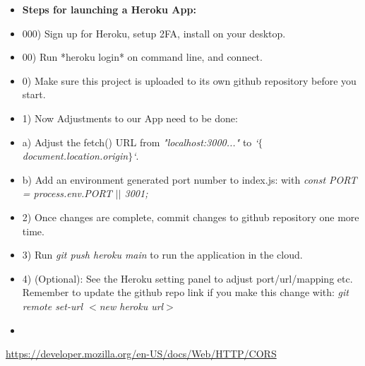 \documentclass[8pt,a4paper]{extarticle}
\begin{document}
\begin{itemize}
\item \textbf{Steps for launching a Heroku App:}

\item 000) Sign up for Heroku, setup 2FA, install on your desktop.

\item 00) Run *heroku login* on command line, and connect.

\item 0) Make sure this project is uploaded to its own github repository before you start.

\item 1) Now Adjustments to our App need to be done:

\item a) Adjust the fetch() URL from \textit{"localhost:3000..."} to \textit{`$\{$document.location.origin$\}$`}.

\item   b) Add an environment generated port number to index.js: with \textit{const PORT = process.env.PORT $\vert \vert$ 3001;}

\item 2) Once changes are complete, commit changes to github repository one more time.

\item 3) Run \textit{git push heroku main} to run the application in the cloud.

\item 4) (Optional): See the Heroku setting panel to adjust port/url/mapping etc. Remember to update the github repo link if you make this change with:  \textit{git remote set-url $<$new heroku url$>$}

\item
\end{itemize}


\begin{thebibliography}{9}

\url{https://developer.mozilla.org/en-US/docs/Web/HTTP/CORS}	
\end{thebibliography}
\end{document}
